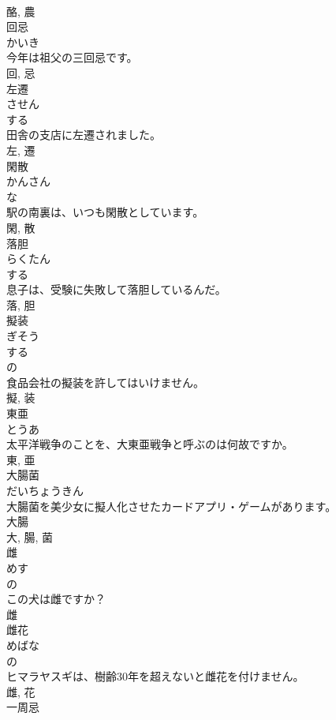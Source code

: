 \documentclass[8pt]{extreport}
\begin{document}
\begin{CJK}{UTF8}{min}
\\	酪, 農	
\\	回忌	
\\	かいき	
\\	今年は祖父の三回忌です。	
\\	回, 忌	
\\	左遷	
\\	させん	
\\	する 
\\	田舎の支店に左遷されました。	
\\	左, 遷	
\\	閑散	
\\	かんさん	
\\	な 
\\	駅の南裏は、いつも閑散としています。	
\\	閑, 散	
\\	落胆	
\\	らくたん	
\\	する 
\\	息子は、受験に失敗して落胆しているんだ。	
\\	落, 胆	
\\	擬装	
\\	ぎそう	
\\	する 
\\	の 
\\	食品会社の擬装を許してはいけません。	
\\	擬, 装	
\\	東亜	
\\	とうあ	
\\	太平洋戦争のことを、大東亜戦争と呼ぶのは何故ですか。	
\\	東, 亜	
\\	大腸菌	
\\	だいちょうきん	
\\	大腸菌を美少女に擬人化させたカードアプリ・ゲームがあります。	
\\	大腸 
\\	大, 腸, 菌	
\\	雌	
\\	めす	
\\	の 
\\	この犬は雌ですか？	
\\	雌	
\\	雌花	
\\	めばな	
\\	の 
\\	ヒマラヤスギは、樹齢30年を超えないと雌花を付けません。	
\\	雌, 花	
\\	一周忌	

\end{CJK}
\end{document}
